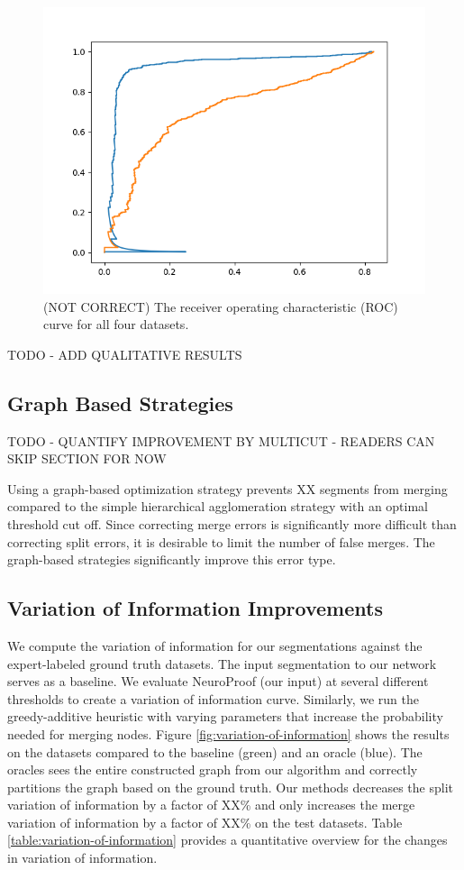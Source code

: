 \begin{figure}
	\includegraphics[width=0.9\linewidth]{./figures/roc-microns-300-test.png}
	\caption{(NOT CORRECT) The receiver operating characteristic (ROC) curve for all four datasets.}
	\label{fig:network-results}
\end{figure}

TODO - ADD QUALITATIVE RESULTS

\subsection{Graph Based Strategies}

TODO - QUANTIFY IMPROVEMENT BY MULTICUT - READERS CAN SKIP SECTION FOR NOW

Using a graph-based optimization strategy prevents XX segments from merging compared to the simple hierarchical agglomeration strategy with an optimal threshold cut off. Since correcting merge errors is significantly more difficult than correcting split errors, it is desirable to limit the number of false merges. The graph-based strategies significantly improve this error type. 

\subsection{Variation of Information Improvements}

We compute the variation of information for our segmentations against the expert-labeled ground truth datasets. 
The input segmentation to our network serves as a baseline. 
We evaluate NeuroProof (our input) at several different thresholds to create a variation of information curve. 
Similarly, we run the greedy-additive heuristic with varying parameters that increase the probability needed for merging nodes. 
Figure \ref{fig:variation-of-information} shows the results on the datasets compared to the baseline (green) and an oracle (blue). 
The oracles sees the entire constructed graph from our algorithm and correctly partitions the graph based on the ground truth. 
Our methods decreases the split variation of information by a factor of XX\% and only increases the merge variation of information by a factor of XX\% on the test datasets. 
Table \ref{table:variation-of-information} provides a quantitative overview for the changes in variation of information.

